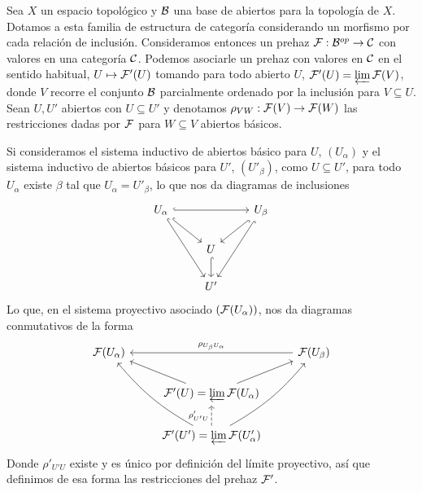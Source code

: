 \documentclass[twoside]{article}
\begin{document}
\begin{ej}[EGA, 0-3.2.1]\label{prehaztop}%
Sea $X$ un espacio topológico y ${\mathcal B}$ una base de abiertos para la topología de $X$. Dotamos a esta familia de estructura de categoría considerando un morfismo por cada relación de inclusión. Consideramos entonces un prehaz $\mathcal{F}:{\mathcal B}^{op}\to{\mathcal C}$ con valores en una categoría ${\mathcal C}$. Podemos asociarle un prehaz con valores en ${\mathcal C}$ en el sentido habitual, $U\mapsto \mathcal{F}'(U)$ tomando para todo abierto $U$, $\mathcal{F}'(U)=\varprojlim\mathcal{F}(V)$, donde $V$ recorre el conjunto ${\mathcal B}$ parcialmente ordenado por la inclusión para $V\subseteq U$. Sean $U,U'$ abiertos con $U\subseteq U'$ y denotamos $\rho_{VW}:\mathcal{F}(V)\to\mathcal{F}(W)$ las restricciones dadas por $\mathcal{F}$ para $W\subseteq V$ abiertos básicos.

Si consideramos el sistema inductivo de abiertos básico para $U$, $(U_\alpha)$ y el sistema inductivo de abiertos básicos para $U'$, $(U'_\beta)$, como $U\subseteq U'$, para todo $U_\alpha$ existe $\beta$ tal que $U_\alpha=U'_\beta$, lo que nos da diagramas de inclusiones
\[
\begin{tikzcd}
U_\alpha\arrow[rr, hookrightarrow]\arrow[ddr, hookrightarrow]\arrow[dr, hookrightarrow]& & U_\beta\arrow[dl, hookrightarrow]\arrow[ddl,hookrightarrow]\\
& U\arrow[d, hookrightarrow]& \\
& U' &
\end{tikzcd}
\]
Lo que, en el sistema proyectivo asociado $(\mathcal{F}(U_\alpha))$, nos da diagramas conmutativos de la forma
\[
\begin{tikzcd}
\calF(U_\alpha)& & \calF(U_\beta)\arrow[ll, "\rho_{U_\beta U_\alpha}"']\\
& \calF'(U)=\varprojlim\calF(U_\alpha)\arrow[ur]\arrow[ul]& \\
& \calF'(U')=\varprojlim\calF(U'_\alpha)\arrow[u, dashed, "\rho'_{U'U}"]\arrow[uul,bend left=10] \arrow[uur,bend right=10]&
\end{tikzcd}
\]
Donde $\rho'_{U'U}$ existe y es único por definición del límite proyectivo, así que definimos de esa forma las restricciones del prehaz $\mathcal{F}'$.%

\end{ej}
\end{document}
